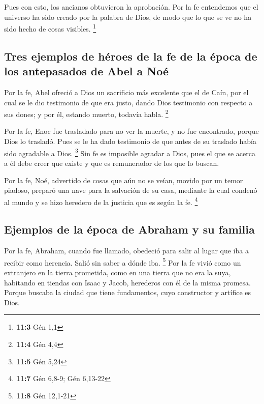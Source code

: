 \begin{paracol}{2}
 Pues con esto, los ancianos obtuvieron la aprobación.
 Por la fe entendemos que el universo ha sido creado por
la palabra de Dios, de modo que lo que se ve no ha sido hecho de cosas
visibles. \footnote{\textbf{11:3} Gén 1,1}

\hypertarget{tres-ejemplos-de-huxe9roes-de-la-fe-de-la-uxe9poca-de-los-antepasados-de-abel-a-nouxe9}{%
\subsection{Tres ejemplos de héroes de la fe de la época de los
antepasados \hspace{0pt}\hspace{0pt}de Abel a
Noé}\label{tres-ejemplos-de-huxe9roes-de-la-fe-de-la-uxe9poca-de-los-antepasados-de-abel-a-nouxe9}}

 Por la fe, Abel ofreció a Dios un sacrificio más
excelente que el de Caín, por el cual se le dio testimonio de que era
justo, dando Dios testimonio con respecto a sus dones; y por él, estando
muerto, todavía habla. \footnote{\textbf{11:4} Gén 4,4}

 Por la fe, Enoc fue trasladado para no ver la muerte, y
no fue encontrado, porque Dios lo trasladó. Pues se le ha dado
testimonio de que antes de su traslado había sido agradable a Dios.
\footnote{\textbf{11:5} Gén 5,24}  Sin fe es imposible
agradar a Dios, pues el que se acerca a él debe creer que existe y que
es remunerador de los que lo buscan.

 Por la fe, Noé, advertido de cosas que aún no se veían,
movido por un temor piadoso, preparó una nave para la salvación de su
casa, mediante la cual condenó al mundo y se hizo heredero de la
justicia que es según la fe. \footnote{\textbf{11:7} Gén 6,8-9; Gén
  6,13-22}

\hypertarget{ejemplos-de-la-uxe9poca-de-abraham-y-su-familia}{%
\subsection{Ejemplos de la época de Abraham y su
familia}\label{ejemplos-de-la-uxe9poca-de-abraham-y-su-familia}}

 Por la fe, Abraham, cuando fue llamado, obedeció para
salir al lugar que iba a recibir como herencia. Salió sin saber a dónde
iba. \footnote{\textbf{11:8} Gén 12,1-21}  Por la fe vivió
como un extranjero en la tierra prometida, como en una tierra que no era
la suya, habitando en tiendas con Isaac y Jacob, herederos con él de la
misma promesa.  Porque buscaba la ciudad que tiene
fundamentos, cuyo constructor y artífice es Dios.


\end{paracol}
